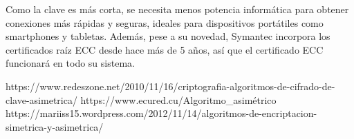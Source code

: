 \documentclass{article}
\begin{document}
Como la clave es más corta, se necesita menos potencia informática para obtener conexiones más rápidas y seguras, ideales para dispositivos portátiles como smartphones y tabletas. Además, pese a su novedad, Symantec incorpora los certificados raíz ECC desde hace más de 5 años, así que el certificado ECC funcionará en todo su sistema.







https://www.redeszone.net/2010/11/16/criptografia-algoritmos-de-cifrado-de-clave-asimetrica/
https://www.ecured.cu/Algoritmo_asimétrico
https://mariiss15.wordpress.com/2012/11/14/algoritmos-de-encriptacion-simetrica-y-asimetrica/
\end{document}
